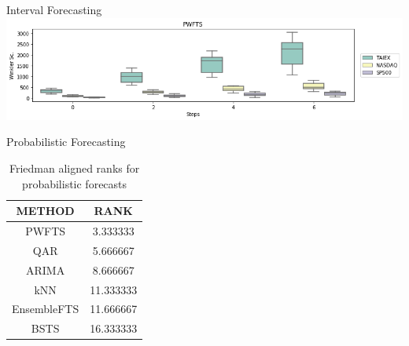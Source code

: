 \documentclass{beamer}
\begin{document}
\begin{frame}{Interval Forecasting}
\includegraphics[width=\textwidth]{figures/pwfts_ahead_interval.png}
\end{frame}

\begin{frame}{Probabilistic Forecasting}
\begin{table}[htb]
    \caption{CRPS for one step ahead interval forecasts}
    \label{tab:pwfts_probabilistic_results}
\end{table}

\begin{table}[hbt]
\small
    \centering
    \begin{tabular}{|c|c|}
\hline
       METHOD &       RANK \\
\hline
PWFTS &   3.333333 \\
QAR &   5.666667 \\
ARIMA &   8.666667 \\
kNN &  11.333333 \\
EnsembleFTS &  11.666667 \\
BSTS &  16.333333 \\ \hline
\end{tabular}
    \caption{Friedman aligned ranks for probabilistic forecasts }
    \label{tab:pwfts_probabilistic_ranks}
\end{table}
\end{frame}
\end{document}

